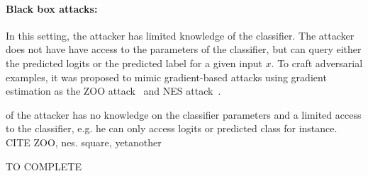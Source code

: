 \paragraph{Black box attacks:} In this setting, the attacker has limited knowledge of the classifier. The attacker does not have have access to the parameters of the classifier, but can query either the predicted logits or the predicted label for a given input $x$. To craft adversarial examples, it was proposed to mimic gradient-based attacks using gradient estimation as the ZOO attack~\citep{xxx} and NES attack~\citep{ilyas2018black,ilyas2019adversarial}. 



of the attacker has no knowledge on the classifier parameters and a limited access to the classifier, e.g. he can only access logits or predicted class for instance. CITE ZOO, nes. square, yetanother

TO COMPLETE






